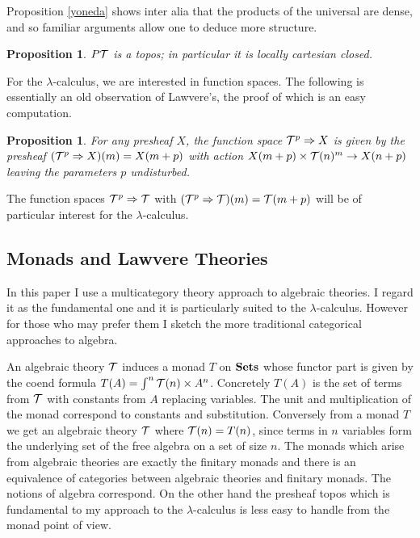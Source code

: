 \documentclass[12pt, amstex, amssymb]{article}
\newtheorem{proposition}[theorem]{Proposition}
\newcommand{\mcat}{\cal}
\begin{document}
Proposition \ref{yoneda} shows inter alia that the products of the 
universal are
dense, and so familiar arguments allow one to deduce more structure.
\begin{proposition} $P{\mcat T}$ is a topos; in
particular it is locally cartesian 
closed.
\end{proposition}
For the $\lambda$-calculus, we are interested in function spaces.
The following is essentially an old observation of Lawvere's,
the proof of which is an easy computation.
\begin{proposition}\label{lawvere}
For any presheaf $X$, the function space ${\mcat T}^p \Rightarrow X$
is given by the presheaf 
$({\mcat T}^p \Rightarrow X) (m) = X(m+p)$ with action 
$X(m+p) \times {\mcat T}(n)^m \to X(n+p)$
leaving the parameters $p$ undisturbed.  
\end{proposition}
The function spaces 
${\mcat T}^p \Rightarrow {\mcat T}$ with 
$({\mcat T}^p \Rightarrow {\mcat T})(m) = {\mcat T}(m+p)$
will be of particular interest for the $\lambda$-calculus.

\subsection{Monads and Lawvere Theories}\label{monlaw}
In this paper I use a multicategory theory approach
to algebraic theories. I regard it as the fundamental one
and it is particularly suited to the $\lambda$-calculus.
However for those who may prefer them I sketch the 
more traditional categorical approaches to algebra.

An algebraic theory $\mcat T$ induces a monad $T$ on $\bf Sets$ 
whose functor part is given by the coend formula 
$T(A) = \int^n {\mcat T}(n)
\times A^n$. 
Concretely $T(A)$ is the set of terms
from $\mcat T$ with constants from $A$ replacing variables.
The unit and multiplication of the monad correspond to constants
and substitution.
Conversely from a monad $T$ we get an algebraic theory
$\mcat T$ where ${\mcat T}(n) = T(n)$, since
terms in $n$ variables form the underlying set of the free
algebra on a set of size $n$. The monads which arise from 
algebraic theories are exactly the finitary monads
and there is an equivalence of categories between
algebraic theories and finitary monads. The
notions of algebra correspond. On the other
hand the presheaf topos which is fundamental to
my approach to the $\lambda$-calculus is less 
easy to handle from the monad point of view.
\end{document}
